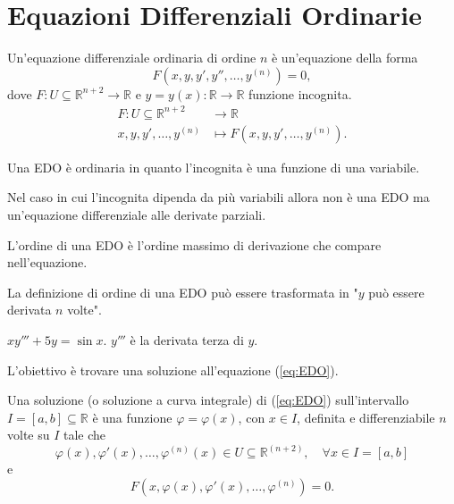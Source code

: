 \section{Equazioni Differenziali Ordinarie}
\begin{definition}
    Un'equazione differenziale ordinaria di ordine $n$ è un'equazione della forma
    \begin{equation}\label{eq:EDO}
        F(x,y,y', y'', \hdots, y^{(n)})=0,
    \end{equation}
    dove $F\colon U\subseteq\mathbb R^{n+2}\rightarrow\mathbb R$ e $y=y(x)\colon\mathbb R\rightarrow\mathbb R$ funzione incognita.
    \begin{align*}
        F\colon U\subseteq\mathbb R^{n+2} & \rightarrow\mathbb R\\
        x,y,y',\hdots, y^{(n)} & \mapsto F(x,y,y', \hdots, y^{(n)}).
    \end{align*}
\end{definition}

\begin{definition}
    Una EDO è ordinaria in quanto l'incognita è una funzione di una variabile.
\end{definition}

Nel caso in cui l'incognita dipenda da più variabili allora non è una EDO ma un'equazione differenziale alle derivate parziali.

\begin{definition}
    L'ordine di una EDO è l'ordine massimo di derivazione che compare nell'equazione.
\end{definition}

La definizione di ordine di una EDO può essere trasformata in "$y$ può essere derivata $n$ volte".

\begin{example}
    $xy'''+5y=\sin x$. $y'''$ è la derivata terza di $y$.
\end{example}

L'obiettivo è trovare una soluzione all'equazione (\ref{eq:EDO}).

\begin{definition}\label{def:curva_integrale_EDO}
    Una soluzione (o soluzione a curva integrale) di (\ref{eq:EDO}) sull'intervallo $I=[a,b]\subseteq\mathbb R$ è una funzione $\varphi=\varphi(x)$, con $x\in I$, definita e differenziabile $n$ volte su $I$ tale che
    \begin{equation*}
        \varphi(x),\varphi'(x),\hdots,\varphi^{(n)}(x)\in U\subseteq\mathbb R^{(n+2)},\quad \forall x\in I=[a,b]
    \end{equation*}
    e
    \begin{equation*}
        F(x,\varphi(x),\varphi'(x),\hdots,\varphi^{(n)})=0.
    \end{equation*}
\end{definition}

